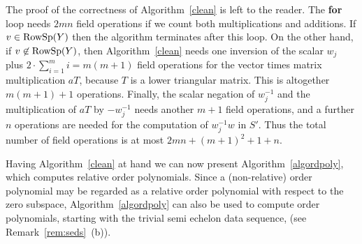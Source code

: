 \smallskip
{}
The proof of the correctness of Algorithm~\ref{clean} is left to the
reader.
%
The \textbf{for} loop needs $2mn$ field operations if we count both multiplications
and additions. If $v\in\mathrm{RowSp}(Y)$ then the algorithm terminates after this loop.
On the other hand, if  $v\not\in\mathrm{RowSp}(Y)$, then 
Algorithm~\ref{clean} needs one inversion
of the scalar $w_j$ plus $2 \cdot \sum_{i=1}^m i = m(m+1)$
field operations for the vector times matrix multiplication
$aT$, because $T$ is a lower triangular matrix. This is altogether $m(m+1)+1$ operations. 
Finally, the scalar negation of $w_j^{-1}$ and the multiplication of $aT$ by 
$-w_j^{-1}$ needs another $m+1$ field operations, and a further $n$ operations 
are needed for the computation of $w_j^{-1} w$ in $S'$. Thus the
total number of field operations is at most $2mn + (m+1)^2 + 1 + n$.
\proofend

\smallskip
Having Algorithm~\ref{clean} at hand we can now present
Algorithm~\ref{algordpoly}, which computes relative order polynomials.
Since a (non-relative) order polynomial may be regarded as a relative order
polynomial with respect to the zero subspace, Algorithm~\ref{algordpoly}
can also be used to compute order polynomials, starting with the trivial semi
echelon data sequence, (see Remark~\ref{rem:seds}~(b)).

